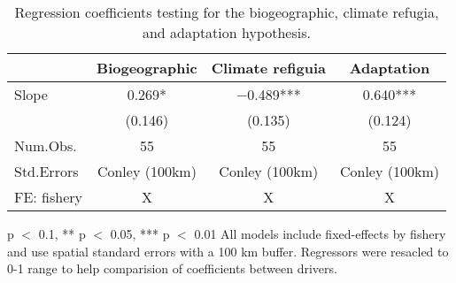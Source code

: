 \begin{table}

\caption{\label{tab:biophysical_vs_effect}Regression coefficients testing for the biogeographic, climate refugia, and adaptation hypothesis.}
\centering
\begin{threeparttable}
\begin{tabular}[t]{lccc}
\toprule
  & Biogeographic & Climate refiguia & Adaptation\\
\midrule
Slope & \num{0.269}* & \num{-0.489}*** & \num{0.640}***\\
 & (\num{0.146}) & (\num{0.135}) & (\num{0.124})\\
\midrule
Num.Obs. & \num{55} & \num{55} & \num{55}\\
Std.Errors & Conley (100km) & Conley (100km) & Conley (100km)\\
FE: fishery & X & X & X\\
\bottomrule
\end{tabular}
\begin{tablenotes}
\item * p $<$ 0.1, ** p $<$ 0.05, *** p $<$ 0.01 All models include fixed-effects by fishery and use spatial standard errors with a 100 km buffer. Regressors were resacled to 0-1 range to help comparision of coefficients between drivers.
\end{tablenotes}
\end{threeparttable}
\end{table}
